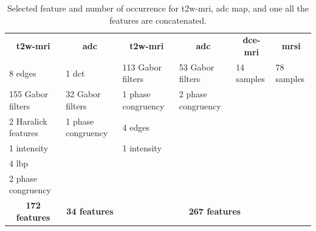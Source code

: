 \documentclass[a4paper,num-refs]{wiley-article}
\begin{document}
\begin{table}
  \caption{Selected feature and number of occurrence for \acs*{t2w}-\acs*{mri}, \acs*{adc} map, and one all the features are concatenated.}
  \centering
  \scriptsize
  \begin{tabular}{llllll}
    \toprule
    \multicolumn{1}{c}{\textbf{\acs*{t2w}-\acs*{mri}}} & \multicolumn{1}{c}{\textbf{\acs*{adc}}} & \multicolumn{1}{c}{\textbf{\acs*{t2w}-\acs*{mri}}} & \multicolumn{1}{c}{\textbf{\acs*{adc}}} & \multicolumn{1}{c}{\textbf{\acs*{dce}-\acs*{mri}}} & \multicolumn{1}{c}{\textbf{\acs*{mrsi}}} \\
    \cmidrule(lr){1-1} \cmidrule(lr){2-2} \cmidrule(lr){3-6}
    8 edges & 1 \acs*{dct} & 113 Gabor filters & 53 Gabor filters & 14 samples  & 78 samples \\
    155 Gabor filters & 32 Gabor filters & 1 phase congruency & 2 phase congruency & & \\ 
    2 Haralick features & 1 phase congruency & 4 edges & & & \\
    1 intensity & & 1 intensity & & & \\
    4 \acs*{lbp} & & & & & \\
    2 phase congruency & & & & & \\
    \cmidrule(lr){1-1} \cmidrule(lr){2-2} \cmidrule(lr){3-6}
    \multicolumn{1}{c}{\textbf{172 features}} & \multicolumn{1}{c}{\textbf{34 features}} & \multicolumn{4}{c}{\textbf{267 features}} \\
    \bottomrule
  \end{tabular}
  \label{tab:selfeatocc}
\end{table}
\end{document}
